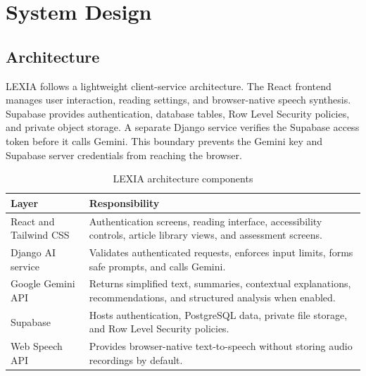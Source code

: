 \documentclass[a4paper]{tietreport}
\begin{document}
\chapter{System Design}
\section{Architecture}
LEXIA follows a lightweight client-service architecture. The React frontend manages user interaction, reading settings, and browser-native speech synthesis. Supabase provides authentication, database tables, Row Level Security policies, and private object storage. A separate Django service verifies the Supabase access token before it calls Gemini. This boundary prevents the Gemini key and Supabase server credentials from reaching the browser.

\begin{table}[H]
\centering
\begin{tabular}{p{} p{}}
\toprule
\textbf{Layer} & \textbf{Responsibility} \\
\midrule
React and Tailwind CSS & Authentication screens, reading interface, accessibility controls, article library views, and assessment screens. \\
Django AI service & Validates authenticated requests, enforces input limits, forms safe prompts, and calls Gemini. \\
Google Gemini API & Returns simplified text, summaries, contextual explanations, recommendations, and structured analysis when enabled. \\
Supabase & Hosts authentication, PostgreSQL data, private file storage, and Row Level Security policies. \\
Web Speech API & Provides browser-native text-to-speech without storing audio recordings by default. \\
\bottomrule
\end{tabular}
\caption{LEXIA architecture components}
\end{table}
\end{document}
